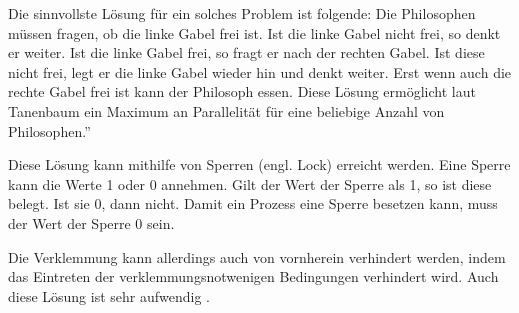 Die sinnvollste Lösung für ein solches Problem ist folgende: Die Philosophen müssen fragen, ob die linke Gabel frei ist. Ist die linke Gabel nicht frei, so denkt er weiter. Ist die linke Gabel frei, so fragt er nach der rechten Gabel. Ist diese nicht frei, legt er die linke Gabel wieder hin und denkt weiter. Erst wenn auch die rechte Gabel frei ist kann der Philosoph essen. Diese Lösung ermöglicht laut Tanenbaum \glqq ein Maximum an Parallelität für eine beliebige Anzahl von Philosophen.''\parencite[S.222]{tanenbaum2016}

Diese Lösung kann mithilfe von Sperren (engl. Lock) erreicht werden. Eine Sperre kann die Werte 1 oder 0 annehmen. Gilt der Wert der Sperre als 1, so ist diese belegt. Ist sie 0, dann nicht. Damit ein Prozess eine Sperre besetzen kann,  muss der Wert der Sperre 0 sein\parencite[vgl.][S.148]{mandl2020}.

Die Verklemmung kann allerdings auch von vornherein verhindert werden, indem das Eintreten der verklemmungsnotwenigen Bedingungen verhindert wird. Auch diese Lösung ist sehr aufwendig \parencite[vgl. ][S.79]{mandl2020}.

















